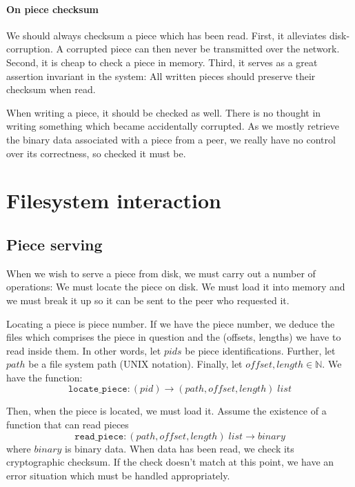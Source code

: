 \documentclass[a4paper]{report}
\begin{document}
\paragraph{On piece checksum}
We should always checksum a piece which has been read. First, it alleviates
disk-corruption. A corrupted piece can then never be transmitted over
the network. Second, it is cheap to check a piece in memory. Third, it
serves as a great assertion invariant in the system: All written
pieces should preserve their checksum when read.

When writing a piece, it should be checked as well. There is no
thought in writing something which became accidentally corrupted. As
we mostly retrieve the binary data associated with a piece from a
peer, we really have no control over its correctness, so checked it
must be.

\section{Filesystem interaction}
\subsection{Piece serving}
When we wish to serve a piece from disk, we must carry out a number of
operations: We must locate the piece on disk. We must load it into
memory and we must break it up so it can be sent to the peer who
requested it.

Locating a piece is piece number. If we have the piece
number, we deduce the files which comprises the piece in question and
the (offsets, lengths) we have to read inside them. In other
words, let $pids$ be piece identifications. Further, let $path$ be a
file system path (UNIX notation). Finally, let $offset, length \in
\mathbb{N}$. We have the function:
\begin{equation*}
  \mathtt{locate\_piece} \colon (pid) \to (path, offset, length)\; list
\end{equation*}

Then, when the piece is located, we must load it. Assume the existence
of a function that can read pieces
\begin{equation*}
  \mathtt{read\_piece} \colon (path, offset, length) \; list \to
  binary
\end{equation*}
where $binary$ is binary data. When data has been read, we check
its cryptographic checksum. If the check doesn't match at this point,
we have an error situation which must be handled appropriately.
\end{document}
